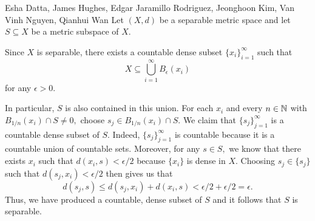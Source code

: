 

\begin{solution}{Esha Datta, James Hughes, Edgar Jaramillo Rodriguez, Jeonghoon Kim, Van Vinh Nguyen, Qianhui Wan}
        Let $(X, d)$ be a separable metric space and let $S\subseteq X$ be a metric subspace of $X$. 

        Since $X$ is separable, there exists a countable dense subset $\{x_i\}_{i=1}^\infty$ such that \[ X\subseteq \bigcup_{i=1}^{\infty} B_\epsilon(x_i) \] for any $\epsilon>0$.

        In particular, $S$ is also contained in this union.
        For each $x_i$ and every $n\in \mathbb{N}$ with $B_{1/n}(x_i)\cap S\neq 0,$ choose $s_j\in B_{1/n}(x_i)\cap S$.
        We claim that $\{s_j\}_{j=1}^\infty$ is a countable dense subset of $S$.
        Indeed, $\{s_j\}_{j=1}^\infty$ is countable because it is a countable union of countable sets.
        Moreover, for any $s\in S,$ we know that there exists $x_i$ such that $d(x_i,s)<\epsilon/2$ because $\{x_i\}$ is dense in $X$.
        Choosing $s_j\in \{s_j\}$ such that $d(s_j,x_i)<\epsilon/2$ then gives us that \[ d(s_j, s)\leq d(s_j, x_i)+d(x_i, s)<\epsilon/2+\epsilon/2=\epsilon. \]
        Thus, we have produced a countable, dense subset of $S$ and it follows that $S$ is separable.
\end{solution}

